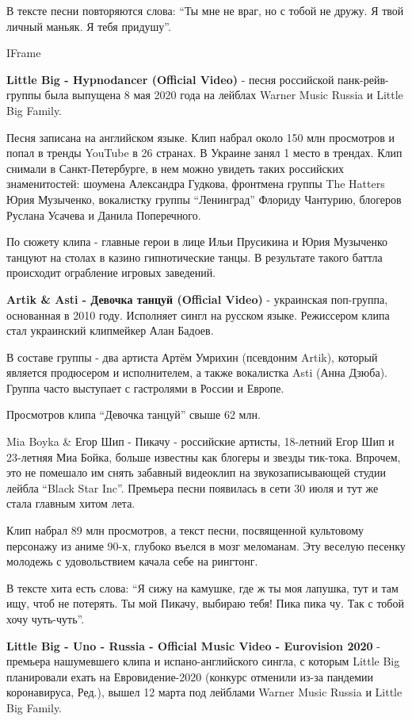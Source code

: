 В тексте песни повторяются слова: \enquote{Ты мне не враг, но с тобой не дружу. Я
твой личный маньяк. Я тебя придушу}. 

IFrame

\textbf{Little Big - Hypnodancer (Official Video)} - песня
российской панк-рейв-группы была выпущена 8 мая 2020 года на лейблах
Warner Music Russia и Little Big Family. 

Песня записана на английском языке. Клип набрал около 150 млн просмотров и
попал в тренды YouTube в 26 странах. В Украине занял 1 место в трендах.  Клип
снимали в Санкт-Петербурге, в нем можно увидеть таких российских знаменитостей:
шоумена Александра Гудкова, фронтмена группы The Hatters Юрия Музыченко,
вокалистку группы \enquote{Ленинград} Флориду Чантурию, блогеров Руслана
Усачева и Данила Поперечного. 

По сюжету клипа - главные герои в лице Ильи Прусикина и Юрия Музыченко танцуют
на столах в казино гипнотические танцы. В результате такого баттла происходит
ограбление игровых заведений. 

\textbf{Artik \& Asti - Девочка танцуй (Official Video)} - украинская поп-группа,
основанная в 2010 году. Исполняет сингл на русском языке. Режиссером клипа
стал украинский клипмейкер Алан Бадоев.

В составе группы - два артиста Артём Умрихин (псевдоним Artik), который
является продюсером и исполнителем, а также вокалистка Asti (Анна Дзюба).
Группа часто выступает с гастролями в России и Европе. 

Просмотров клипа \enquote{Девочка танцуй} свыше 62 млн. 


Mia Boyka \& Егор Шип - Пикачу - российские артисты, 18-летний Егор Шип
и 23-летняя Миа Бойка, больше известны как блогеры и звезды тик-тока.
Впрочем, это не помешало им снять забавный видеоклип на звукозаписывающей
студии лейбла \enquote{Black Star Inc}. Премьера песни появилась в сети 30 июля и
тут же стала главным хитом лета.

Клип набрал 89 млн просмотров, а текст песни, посвященной культовому
персонажу из аниме 90-х, глубоко въелся в мозг меломанам. Эту веселую
песенку молодежь с удовольствием качала себе на рингтонг.

В тексте хита есть слова: \enquote{Я сижу на камушке, где ж ты моя лапушка, тут и
там ищу, чтоб не потерять. Ты мой Пикачу, выбираю тебя! Пика пика чу. Так
с тобой хочу чуть-чуть}.


\textbf{Little Big - Uno - Russia - Official Music Video - Eurovision 2020} -
премьера нашумевшего клипа и испано-английского сингла, с которым Little
Big планировали ехать на Евровидение-2020 (конкурс отменили из-за пандемии
коронавируса, Ред.), вышел 12 марта под лейблами Warner Music Russia и
Little Big Family. 

